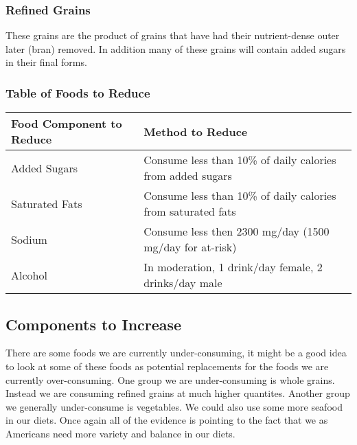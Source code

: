 \documentclass[letterpaper, 11pt]{article}
\begin{document}
\subsubsection{Refined Grains}
\label{sec:org4a6971b}
These grains are the product of grains that have had their nutrient-dense outer later (bran) removed. In addition many of these grains will contain added sugars in their final forms.\\
\subsubsection{Table of Foods to Reduce}
\label{sec:org8ad126e}
\begin{center}
\begin{tabular}{ll}
Food Component to Reduce & Method to Reduce\\
\hline
Added Sugars & Consume less than 10\% of daily calories from added sugars\\
Saturated Fats & Consume less than 10\% of daily calories from saturated fats\\
Sodium & Consume less then 2300 mg/day (1500 mg/day for at-risk)\\
Alcohol & In moderation,  1 drink/day female,  2 drinks/day male\\
\end{tabular}
\end{center}
\subsection{Components to Increase}
\label{sec:orgd2da70f}
There are some foods we are currently under-consuming, it might be a good idea to look at some of these foods as potential replacements for the foods we are currently over-consuming. One group we are under-consuming is whole grains. Instead we are consuming refined grains at much higher quantites. Another group we generally under-consume is vegetables. We could also use some more seafood in our diets. Once again all of the evidence is pointing to the fact that we as Americans need more variety and balance in our diets.\\
\end{document}
